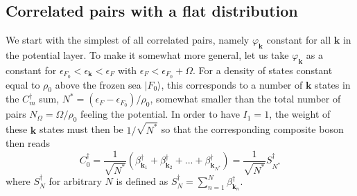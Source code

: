 \documentclass[aps,prb,preprint,groupedaddress,amsmath]{revtex4}
\newcommand{\vk}{\ensuremath{\mathbf{k}}}
\newcommand{\dg}{\ensuremath{\dagger}}
\begin{document}
\subsection{Correlated pairs with a flat distribution}
We start with the simplest of all correlated pairs, namely $\varphi_\vk$ constant for all  $\vk$ in the potential layer. To make it somewhat more general, let us take $\varphi_\vk$  as a constant for $\epsilon_{F_0}<\epsilon_\vk<\epsilon_{F}$ with $\epsilon_{F}<\epsilon_{F_0}+\Omega$. For a density of states  constant equal to $\rho_0$ above the frozen sea $|F_0\rangle$, this corresponds to a number of $\vk$ states in the $C_m^\dg$ sum, $N^*=(\epsilon_{F}-\epsilon_{F_0})/\rho_0$, somewhat smaller than the total number of pairs $N_\Omega=\Omega/\rho_0$ feeling the potential.  In order to have $I_1=1$, the weight of these $\vk$ states must then be $1/\sqrt{N^*}$
so that the corresponding composite boson then reads
 \begin{equation}
C^\dg_0=\frac1{\sqrt{N^*}}(\beta^\dg_{\vk_1}+\beta^\dg_{\vk_2}+...+\beta^\dg_{\vk_{N^*}})=\frac1{\sqrt{N^*}}S^\dg_{N^*}
\end{equation}
 where  $S_N^\dg$ for arbitrary $N$ is defined as $S_N^\dg=\sum_{n=1}^N\beta^\dg_{\vk_n}$. 
\end{document}
